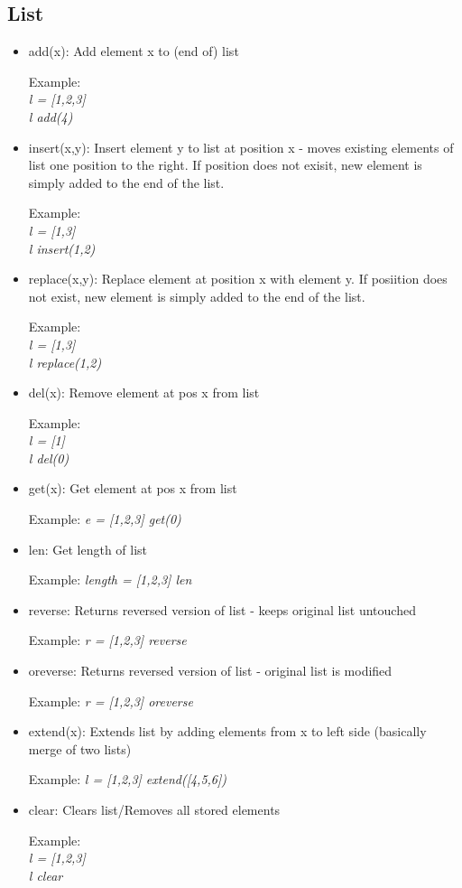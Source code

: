 \documentclass{article}
\begin{document}
\subsection{List}
\label{listbuilt}
\begin{itemize}
\item add(x): Add element x to (end of) list

Example: \\ \textit{l = [1,2,3]} \\ \textit{l add(4)}

\item insert(x,y): Insert element y to list at position x - moves existing elements of list one position to the right. If position does not exisit, new element is simply added to the end of the list.

Example: \\ \textit{l = [1,3]} \\ \textit{l insert(1,2)}

\item replace(x,y): Replace element at position x with element y. If posiition does not exist, new element is simply added to the end of the list.

Example: \\ \textit{l = [1,3]} \\ \textit{l replace(1,2)}

\item del(x): Remove element at pos x from list

Example: \\ \textit{l = [1]} \\ \textit{l del(0)}

\item get(x): Get element at pos x from list

Example: \textit{e = [1,2,3] get(0)}

\item len: Get length of list

Example: \textit{length = [1,2,3] len}

\item reverse: Returns reversed version of list - keeps original list untouched

Example: \textit{r = [1,2,3] reverse}

\item oreverse: Returns reversed version of list - original list is modified

Example: \textit{r = [1,2,3] oreverse}

\item extend(x): Extends list by adding elements from x to left side (basically merge of two lists)

Example: \textit{l = [1,2,3] extend([4,5,6])}

\item clear: Clears list/Removes all stored elements

Example: \\ \textit{l = [1,2,3]} \\ \textit{l clear}
\end{itemize}
\end{document}
